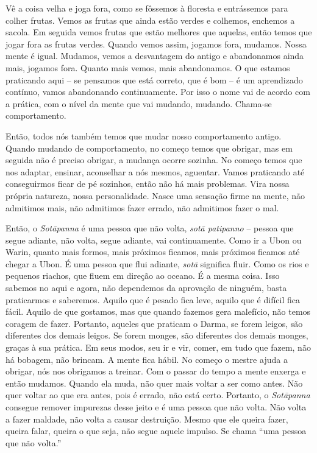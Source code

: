 Vê a coisa velha e joga fora, como se fôssemos à floresta e
entrássemos para colher frutas. Vemos as frutas que ainda estão verdes
e colhemos, enchemos a sacola. Em seguida vemos frutas que estão
melhores que aquelas, então temos que jogar fora as frutas verdes.
Quando vemos assim, jogamos fora, mudamos. Nossa mente é igual.
Mudamos, vemos a desvantagem do antigo e abandonamos ainda mais,
jogamos fora. Quanto mais vemos, mais abandonamos. O que estamos
praticando aqui – se pensamos que está correto, que é bom – é um
aprendizado contínuo, vamos abandonando continuamente. Por isso o nome
vai de acordo com a prática, com o nível da mente que vai mudando,
mudando. Chama-se comportamento. 

Então, todos nós também temos que mudar nosso comportamento antigo.
Quando mudando de comportamento, no começo temos que obrigar, mas em
seguida não é preciso obrigar, a mudança ocorre sozinha. No começo
temos que nos adaptar, ensinar, aconselhar a nós mesmos, aguentar.
Vamos praticando até conseguirmos ficar de pé sozinhos, então não há
mais problemas. Vira nossa própria natureza, nossa personalidade. Nasce
uma sensação firme na mente, não admitimos mais, não admitimos fazer
errado, não admitimos fazer o mal. 

Então, o \textit{Sotāpanna} é uma pessoa que não volta,
\textit{sotā patipanno} – pessoa que segue adiante, não volta, segue
adiante, vai continuamente. Como ir a Ubon ou Warin, quanto mais
formos, mais próximos ficamos, mais próximos ficamos até chegar a Ubon.
É uma pessoa que flui adiante, \textit{sotā} significa fluir. Como os
rios e pequenos riachos, que fluem em direção ao oceano. É a mesma
coisa. Isso sabemos no aqui e agora, não dependemos da aprovação de
ninguém, basta praticarmos e saberemos. Aquilo que é pesado fica leve,
aquilo que é difícil fica fácil. Aquilo de que gostamos, mas que quando
fazemos gera malefício, não temos coragem de fazer. Portanto, aqueles
que praticam o Darma, se forem leigos, são diferentes dos demais
leigos. Se forem monges, são diferentes dos demais monges, graças à sua
prática. Em seus modos, seu ir e vir, comer, em tudo que fazem, não há
bobagem, não brincam. A mente fica hábil. No começo o mestre ajuda a
obrigar, nós nos obrigamos a treinar. Com o passar do tempo a mente
enxerga e então mudamos. Quando ela muda, não quer mais voltar a ser
como antes. Não quer voltar ao que era antes, pois é errado, não está
certo. Portanto, o \textit{Sotāpanna} consegue remover impurezas
desse jeito e é uma pessoa que não volta. Não volta a fazer maldade,
não volta a causar destruição. Mesmo que ele queira fazer, queira
falar, queira o que seja, não segue aquele impulso. Se chama “uma
pessoa que não volta.” 

